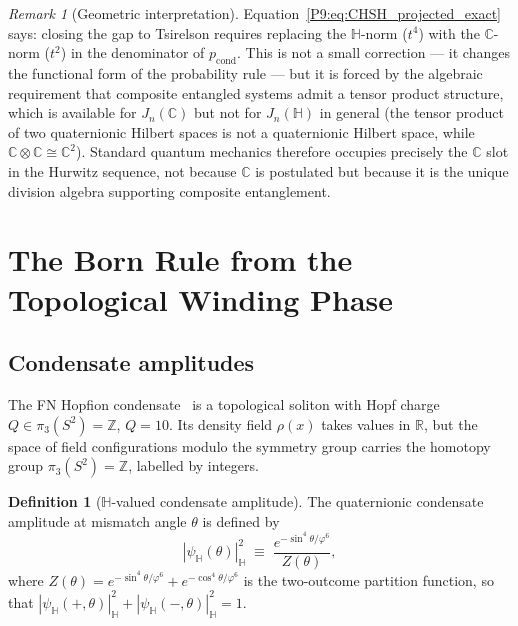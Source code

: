 \documentclass[11pt,a4paper]{article}
\theoremstyle{definition}
\newtheorem{definition}[theorem]{Definition}
\theoremstyle{remark}
\newtheorem{remark}[theorem]{Remark}
\newcommand{\vp}{\varphi}
\newcommand{\CC}{\mathbb{C}}
\newcommand{\HH}{\mathbb{H}}
\newcommand{\RR}{\mathbb{R}}
\newcommand{\ZZ}{\mathbb{Z}}
\newcommand{\pcond}{p_{\mathrm{cond}}}
\begin{document}
\begin{remark}[Geometric interpretation]
\label{P9:rem:geometric_interp_hh_cc}
Equation~\eqref{P9:eq:CHSH_projected_exact} says: closing the gap to Tsirelson
requires replacing the $\HH$-norm ($t^4$) with the $\CC$-norm ($t^2$)
in the denominator of $\pcond$.
This is not a small correction — it changes the functional form of the
probability rule — but it is forced by the algebraic requirement that
composite entangled systems admit a tensor product structure, which is
available for $J_n(\CC)$ but not for $J_n(\HH)$ in general (the
tensor product of two quaternionic Hilbert spaces is not a quaternionic
Hilbert space, while $\CC\otimes\CC\cong\CC^2$).
Standard quantum mechanics therefore occupies precisely the $\CC$ slot
in the Hurwitz sequence, not because $\CC$ is postulated but because it
is the unique division algebra supporting composite entanglement.
\end{remark}
 
\section{The Born Rule from the Topological Winding Phase}
\label{P9:sec:born}
 
\subsection{Condensate amplitudes}

The FN Hopfion condensate~\cite{Paper1} is a topological soliton
with Hopf charge $Q\in\pi_3(S^2)=\ZZ$, $Q=10$.
Its density field $\rho(x)$ takes values in $\RR$, but the space of
field configurations modulo the symmetry group carries the homotopy
group $\pi_3(S^2)=\ZZ$, labelled by integers.
 
\begin{definition}[$\HH$-valued condensate amplitude]
\label{P9:def:H_amplitude}
The quaternionic condensate amplitude at mismatch angle $\theta$ is defined by
\begin{equation}
  |\psi_\HH(\theta)|_\HH^2
  \;\equiv\;
  \frac{e^{-\sin^4\theta/\vp^6}}{Z(\theta)},
  \label{P9:eq:psi_H}
\end{equation}
where $Z(\theta) = e^{-\sin^4\theta/\vp^6}+e^{-\cos^4\theta/\vp^6}$
is the two-outcome partition function, so that $|\psi_\HH(+,\theta)|_\HH^2
+ |\psi_\HH(-,\theta)|_\HH^2 = 1$.
\end{definition}
 
\end{document}
